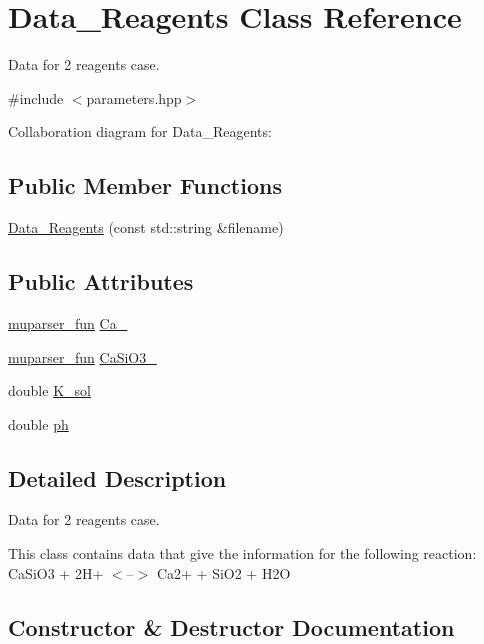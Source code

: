 \hypertarget{classData__2Reagents}{}\section{Data\+\_\+Reagents Class Reference}
\label{classData__2Reagents}


Data for 2 reagents case.  




{\ttfamily \#include $<$parameters.\+hpp$>$}



Collaboration diagram for Data\+\_\+Reagents\+:
\subsection*{Public Member Functions}
\begin{DoxyCompactItemize}
\item 
\hyperlink{classData__2Reagents_a2a78ff38ce2ab53ffca0f2c7dd9523bc}{Data\+\_\+Reagents} (const std\+::string \&filename)
\end{DoxyCompactItemize}
\subsection*{Public Attributes}
\begin{DoxyCompactItemize}
\item 
\hyperlink{classmuparser__fun}{muparser\+\_\+fun} \hyperlink{classData__2Reagents_a175155917ff4901396783c66ed3a8c24}{Ca\+\_}
\item 
\hyperlink{classmuparser__fun}{muparser\+\_\+fun} \hyperlink{classData__2Reagents_a9ca86e357343363bb84430db281cbc95}{Ca\+Si\+O3\+\_}
\item 
double \hyperlink{classData__2Reagents_a6623d1076af5a003c66a498b078fcf99}{K\+\_\+sol}
\item 
double \hyperlink{classData__2Reagents_aaa48e75cb9735514e5ba6a3ce3e0cce9}{ph}
\end{DoxyCompactItemize}


\subsection{Detailed Description}
Data for 2 reagents case. 

This class contains data that give the information for the following reaction\+: Ca\+Si\+O3 + 2\+H+ $<$--$>$ Ca2+ + Si\+O2 + H2O 

\subsection{Constructor \& Destructor Documentation}
\mbox{\label{classData__2Reagents_a2a78ff38ce2ab53ffca0f2c7dd9523bc}} 
